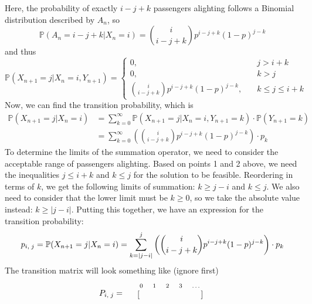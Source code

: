 \documentclass[12pt]{article}
\newcommand{\matindex}[1]{\mbox{\scriptsize#1}}%
\begin{document}
\noindent Here, the probability of exactly $i - j + k$ passengers alighting follows a Binomial distribution described by $A_n$, so \begin{equation}
    \mathbb{P}(A_n = i - j + k | X_n = i) = \binom{i}{i - j + k}p^{i - j + k}(1-p)^{j - k}
\end{equation} and thus \begin{equation}
    \mathbb{P}(X_{n+1} = j | X_n = i, Y_{n+1}) = \begin{cases}
        0, \quad & j > i + k \\ 
        0, \quad & k > j \\
        \displaystyle\binom{i}{i-j+k}p^{i - j + k}(1-p)^{j - k}, \quad & k \leq j \leq i + k  
    \end{cases}
\end{equation} Now, we can find the transition probability, which is \begin{align*}
    \mathbb{P}(X_{n+1} = j | X_n = i) &= \sum_{k=0}^{\infty} \mathbb{P}(X_{n+1} = j | X_n = i, Y_{n+1} = k) \cdot \mathbb{P}(Y_{n+1} = k) \\ 
    &= \sum_{k=0}^{\infty} \left( \displaystyle\binom{i}{i-j+k}p^{i - j + k}(1-p)^{j - k} \right) \cdot p_k
\end{align*} To determine the limits of the summation operator, we need to consider the acceptable range of passengers alighting. Based on points 1 and 2 above, we need the inequalities $j \leq i + k$ and $k \leq j$ for the solution to be feasible. Reordering in terms of $k$, we get the following limits of summation: $k \geq j - i$ and $k \leq j$. We also need to consider that the lower limit must be $k \geq 0$, so we take the absolute value instead: $k \geq \vert j - i \vert$. Putting this together, we have an expression for the transition probability: \begin{equation}\label{eq:4-pij}
     p_{i,\; j} = \mathbb{P}(X_{n+1} = j | X_n = i) = \sum_{k=\vert j - i \vert}^{j} \left( \displaystyle\binom{i}{i-j+k}p^{i - j + k}(1-p)^{j - k} \right) \cdot p_k \\ 
\end{equation} The transition matrix will look something like (ignore first) \begin{equation}
    P_{i, \; j} = \begin{blockarray}{cccccc}
                    & \matindex{0} & \matindex{1} & \matindex{2} &\matindex{3} &\matindex{\dots} \\ 
                \begin{block}{c[ccccc]}

\end{block}
\end{blockarray}
\end{equation}
\end{document}
